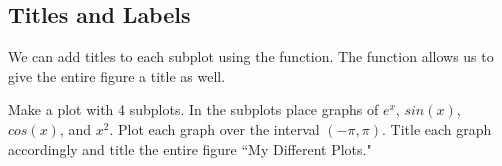\subsection*{Titles and Labels}

We can add titles to each subplot using the  function.
The  function allows us to give the entire figure a title as well.

\begin{problem}
Make a plot with 4 subplots.
In the subplots place graphs of $e^x$, $sin(x)$, $cos(x)$, and $x^2$.
Plot each graph over the interval $(-\pi,\pi)$.
Title each graph accordingly and title the entire figure ``My Different Plots."
\end{problem}


